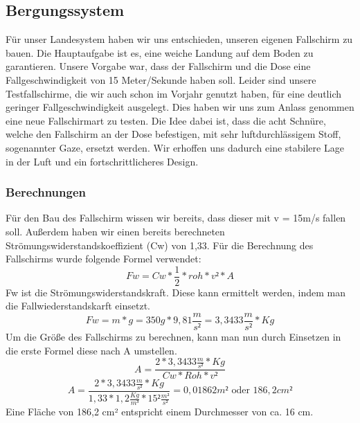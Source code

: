 \subsection{Bergungssystem}
Für unser Landesystem haben wir uns entschieden, unseren eigenen Fallschirm zu bauen. Die Hauptaufgabe ist es, eine weiche Landung auf dem Boden zu garantieren. Unsere Vorgabe war, dass der Fallschirm und die Dose eine Fallgeschwindigkeit von 15 Meter/Sekunde haben soll. Leider sind unsere Testfallschirme, die wir auch schon im Vorjahr genutzt haben, für eine deutlich geringer Fallgeschwindigkeit ausgelegt. Dies haben wir uns zum Anlass genommen eine neue Fallschirmart zu testen. Die Idee dabei ist, dass die acht Schnüre, welche den Fallschirm an der Dose befestigen, mit sehr luftdurchlässigem Stoff, sogenannter Gaze, ersetzt werden. Wir erhoffen uns dadurch eine stabilere Lage in der Luft und ein fortschrittlicheres Design.

\subsubsection{Berechnungen}
Für den Bau des Fallschirm wissen wir bereits, dass dieser mit v = 15m/s fallen soll. Außerdem haben wir einen bereits berechneten Strömungswiderstandskoeffizient (Cw) von 1,33. Für die Berechnung des Fallschirms wurde folgende Formel verwendet:
\[
Fw = Cw*\frac{1}{2}*roh*v²*A
\]
Fw ist die Strömungswiderstandskraft. Diese kann ermittelt werden, indem man die Fallwiederstandskarft einsetzt.
\[
Fw = m * g = 350g * 9,81\frac{m}{s²} = 3,3433\frac{m}{s²}*Kg
\]
Um die Größe des Fallschirms zu berechnen, kann man nun durch Einsetzen in die erste Formel diese nach A umstellen.
\[
A=\frac{2*3,3433\frac{m}{s²}*Kg}{Cw*Roh*v²}
\]
\[
A=\frac{2*3,3433\frac{m}{s²}*Kg}{1,33*1,2\frac{Kg}{m³}*15²\frac{m²}{s²}} = 0,01862m² \text{ oder } 186,2cm²
\]
Eine Fläche von 186,2 cm² entspricht einem Durchmesser von ca. 16 cm.

